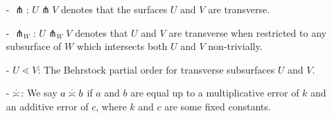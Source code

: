 \begin{itemize}
\item[-] $\pitchfork$: $U \pitchfork V$ denotes that the surfaces $U$ and $V$ are transverse.
\item[-] $\pitchfork_{W}$: $U \pitchfork_W V$ denotes that $U$ and $V$ are transverse when restricted to any subsurface of $W$ which intersects both $U$ and $V$ non-trivially.
\item[-] $U \lessdot V$: The Behrstock partial order for transverse subsurfaces $U$ and $V$.
\item[-] $\emul$: We say $a \emul b$ if $a$ and $b$ are equal up to a multiplicative error of $k$ and an additive error of $c$, where $k$ and $c$ are some fixed constants.
\end{itemize}

